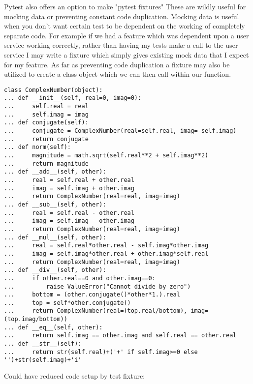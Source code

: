 Pytest also offers an option to make "pytest fixtures" These are wildly useful for mocking data or preventing constant code duplication.
Mocking data is useful when you don't want certain test to be dependent on the working of completely separate code.
For example if we had a feature which was dependent upon a user service working correctly, rather than having my tests make a call to the user service I may write a fixture which simply gives existing mock data that I expect for my feature.
As far as preventing code duplication a fixture may also be utilized to create a class object which we can then call within our function.

\begin{lstlisting}
class ComplexNumber(object):
... def __init__(self, real=0, imag=0):
...     self.real = real
...     self.imag = imag
... def conjugate(self):
...     conjugate = ComplexNumber(real=self.real, imag=-self.imag)
...     return conjugate
... def norm(self):
...     magnitude = math.sqrt(self.real**2 + self.imag**2)
...     return magnitude
... def __add__(self, other):
...     real = self.real + other.real
...     imag = self.imag + other.imag
...     return ComplexNumber(real=real, imag=imag)
... def __sub__(self, other):
...     real = self.real - other.real
...     imag = self.imag - other.imag
...     return ComplexNumber(real=real, imag=imag)
... def __mul__(self, other):
...     real = self.real*other.real - self.imag*other.imag
...     imag = self.imag*other.real + other.imag*self.real
...     return ComplexNumber(real=real, imag=imag)
... def __div__(self, other):
...     if other.real==0 and other.imag==0:
...         raise ValueError("Cannot divide by zero")
...     bottom = (other.conjugate()*other*1.).real
...     top = self*other.conjugate()
...     return ComplexNumber(real=(top.real/bottom), imag=(top.imag/bottom))
... def __eq__(self, other):
...     return self.imag == other.imag and self.real == other.real
... def __str__(self):
...     return str(self.real)+('+' if self.imag>=0 else '')+str(self.imag)+'i'
\end{lstlisting}
Could have reduced code setup by test fixture:
